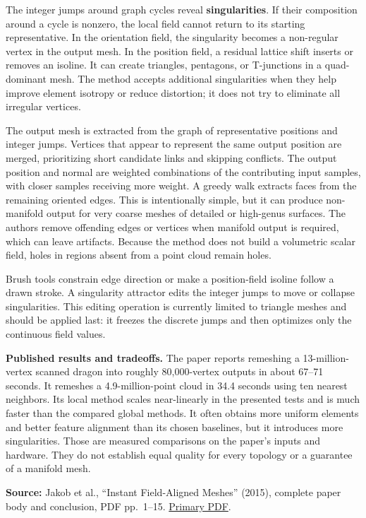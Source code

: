 The integer jumps around graph cycles reveal \textbf{singularities}. If their composition around a cycle is nonzero, the local field cannot return to its starting representative. In the orientation field, the singularity becomes a non-regular vertex in the output mesh. In the position field, a residual lattice shift inserts or removes an isoline. It can create triangles, pentagons, or T-junctions in a quad-dominant mesh. The method accepts additional singularities when they help improve element isotropy or reduce distortion; it does not try to eliminate all irregular vertices.

The output mesh is extracted from the graph of representative positions and integer jumps. Vertices that appear to represent the same output position are merged, prioritizing short candidate links and skipping conflicts. The output position and normal are weighted combinations of the contributing input samples, with closer samples receiving more weight. A greedy walk extracts faces from the remaining oriented edges. This is intentionally simple, but it can produce non-manifold output for very coarse meshes of detailed or high-genus surfaces. The authors remove offending edges or vertices when manifold output is required, which can leave artifacts. Because the method does not build a volumetric scalar field, holes in regions absent from a point cloud remain holes.

Brush tools constrain edge direction or make a position-field isoline follow a drawn stroke. A singularity attractor edits the integer jumps to move or collapse singularities. This editing operation is currently limited to triangle meshes and should be applied last: it freezes the discrete jumps and then optimizes only the continuous field values.

\textbf{Published results and tradeoffs.} The paper reports remeshing a 13-million-vertex scanned dragon into roughly 80,000-vertex outputs in about 67--71 seconds. It remeshes a 4.9-million-point cloud in 34.4 seconds using ten nearest neighbors. Its local method scales near-linearly in the presented tests and is much faster than the compared global methods. It often obtains more uniform elements and better feature alignment than its chosen baselines, but it introduces more singularities. Those are measured comparisons on the paper's inputs and hardware. They do not establish equal quality for every topology or a guarantee of a manifold mesh.

\textbf{Source:} Jakob et al., ``Instant Field-Aligned Meshes'' (2015), complete paper body and conclusion, PDF pp.~1--15. \href{https://igl.ethz.ch/projects/instant-meshes/instant-meshes-SA-2015-jakob-et-al-compressed.pdf}{Primary PDF}.

